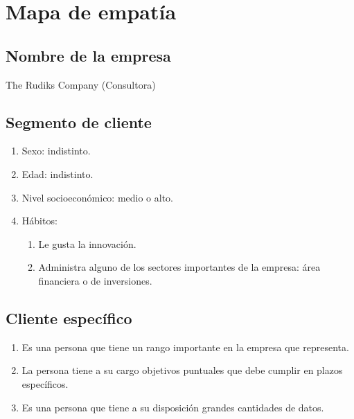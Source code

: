 





\section{Mapa de empatía}
\subsection{Nombre de la empresa}
\begin{center}
	The Rudiks Company (Consultora)
\end{center}

\subsection{Segmento de cliente}

\begin{enumerate}
	\item Sexo: indistinto.
	\item Edad: indistinto.
	\item Nivel socioeconómico: medio o alto.
	\item Hábitos: 
	\begin{enumerate}
		\item Le gusta la innovación. 
		\item Administra alguno de los sectores importantes de la empresa: área financiera o de inversiones. 
	\end{enumerate}
\end{enumerate}


\subsection{Cliente específico}
\begin{enumerate}
	\item Es una persona que tiene un rango importante en la empresa que representa. 
	\item La persona tiene a su cargo objetivos puntuales que debe cumplir en plazos específicos.
	\item Es una persona que tiene a su disposición grandes cantidades de datos. 
\end{enumerate}




%
%

